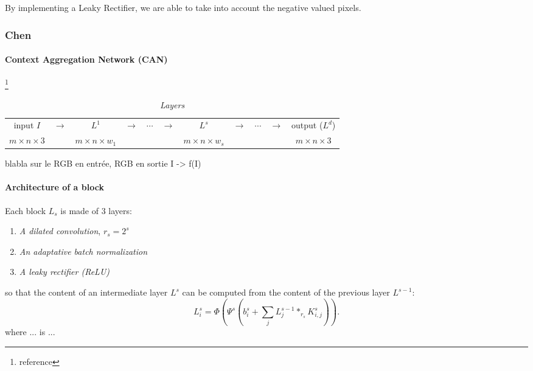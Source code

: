 \documentclass{article}
\begin{document}
            By implementing a Leaky Rectifier, we are able to take into account the negative valued pixels.



        \subsubsection{Chen}
            \paragraph{Context Aggregation Network (CAN)}\footnote{reference}
            \begin{table}[!ht]
                \center
                \begin{tabular}{ccccccccccc}
                    \hline
                    input $I$ & $\longrightarrow$ & $L^1$ & $\longrightarrow$ & $\cdots$ & $\longrightarrow$ & $L^s$ & $\longrightarrow$ & $\cdots$ & $\longrightarrow$ & output ($L^d$)\\
                    $m\times n\times 3$ & & $m\times n\times w_1$ & & & & $m\times n\times w_s$ & & & & $m\times n\times 3$\\
                    \hline
                \end{tabular}
                \caption{\textit{Layers}}
            \end{table}
            blabla sur le RGB en entrée, RGB en sortie I -> f(I)
            \paragraph{Architecture of a block}
            Each block $L_s$ is made of 3 layers:
            \begin{enumerate}
                \item \textit{A dilated convolution}, $r_s=2^s$
                \item \textit{An adaptative batch normalization}
                \item \textit{A leaky rectifier (ReLU)}
            \end{enumerate}
            so that the content of an intermediate layer $L^s$ can be computed from the content of the previous layer $L^{s-1}$:
            \begin{equation}
                L_i^s=\Phi\left(\Psi^s\left(b_i^s+\sum_jL_j^{s-1}*_{r_s}K^s_{i,j}\right)\right).
            \end{equation}
            where ... is ...
\end{document}
